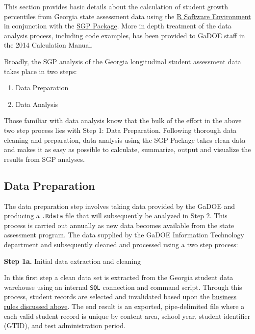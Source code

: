 \documentclass[12pt]{article}
\begin{document}
This section provides basic details about the calculation of student
growth percentiles from Georgia state assessment data using the
\href{http://www.r-project.org/}{R Software Environment} in conjunction
with the \href{https://github.com/CenterForAssessment/SGP}{SGP Package}.
More in depth treatment of the data analysis process, including code
examples, has been provided to GaDOE staff in the 2014 Calculation
Manual.

Broadly, the SGP analysis of the Georgia longitudinal student assessment
data takes place in two steps:

\begin{enumerate}
\def\labelenumi{\arabic{enumi}.}
\itemsep1pt\parskip0pt
\item
  Data Preparation
\item
  Data Analysis
\end{enumerate}

Those familiar with data analysis know that the bulk of the effort in
the above two step process lies with Step 1: Data Preparation. Following
thorough data cleaning and preparation, data analysis using the SGP
Package takes clean data and makes it as easy as possible to calculate,
summarize, output and visualize the results from SGP analyses.

\subsection{Data Preparation}\label{data-preparation}

The data preparation step involves taking data provided by the GaDOE and
producing a \texttt{.Rdata} file that will subsequently be analyzed in
Step 2. This process is carried out annually as new data becomes
available from the state assessment program. The data supplied by the
GaDOE Information Technology department and subsequently cleaned and
processed using a two step process:

\textbf{Step 1a.} Initial data extraction and cleaning

In this first step a clean data set is extracted from the Georgia
student data warehouse using an internal \texttt{SQL} connection and
command script. Through this process, student records are selected and
invalidated based upon the \hyperref[general-business-rules]{business
rules discussed above}. The end result is an exported, pipe-delimited
file where a each valid student record is unique by content area, school
year, student identifier (GTID), and test administration period.
\end{document}
